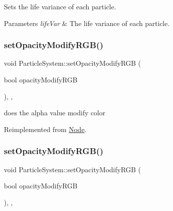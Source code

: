 Sets the life variance of each particle.


\begin{DoxyParams}{Parameters}
{\em life\+Var} & The life variance of each particle. \\
\hline
\end{DoxyParams}
\mbox{\label{classParticleSystem_a2c5a931c70aaa80e3fc098ec0aaf9827}} 
\subsubsection{\texorpdfstring{set\+Opacity\+Modify\+R\+G\+B()}{setOpacityModifyRGB()}\hspace{0.1cm}{\footnotesize\ttfamily [1/2]}}
{\footnotesize\ttfamily void Particle\+System\+::set\+Opacity\+Modify\+R\+GB (\begin{DoxyParamCaption}\item[{bool}]{opacity\+Modify\+R\+GB }\end{DoxyParamCaption})\hspace{0.3cm}{\ttfamily [inline]}, {\ttfamily [override]}, {\ttfamily [virtual]}}

does the alpha value modify color 

Reimplemented from \hyperlink{classNode_a978c5435ab23f76e9efdf0f7e9e288e5}{Node}.

\mbox{\label{classParticleSystem_a2c5a931c70aaa80e3fc098ec0aaf9827}} 
\subsubsection{\texorpdfstring{set\+Opacity\+Modify\+R\+G\+B()}{setOpacityModifyRGB()}\hspace{0.1cm}{\footnotesize\ttfamily [2/2]}}
{\footnotesize\ttfamily void Particle\+System\+::set\+Opacity\+Modify\+R\+GB (\begin{DoxyParamCaption}\item[{bool}]{opacity\+Modify\+R\+GB }\end{DoxyParamCaption})\hspace{0.3cm}{\ttfamily [inline]}, {\ttfamily [override]}, {\ttfamily [virtual]}}

